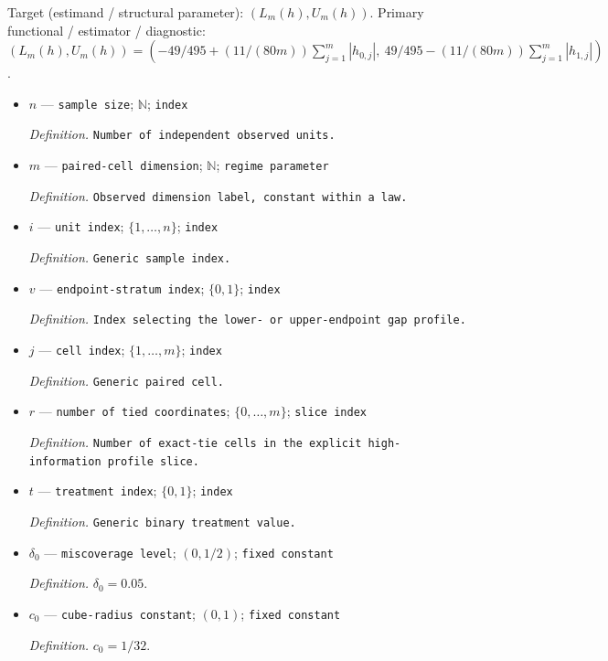 \documentclass{article}
\begin{document}
Target (estimand / structural parameter): \((L_m(h),U_m(h))\).
Primary functional / estimator / diagnostic: \((L_m(h),U_m(h))=(-49/495+(11/(80m))\sum_{j=1}^{m}|h_{0,j}|,\ 49/495-(11/(80m))\sum_{j=1}^{m}|h_{1,j}|)\).
\begin{itemize}
  \item \(n\) --- \texttt{sample size}; \(\mathbb N\); \texttt{index}
  \par\smallskip\noindent\emph{Definition.} \texttt{Number of independent observed units.}
  \item \(m\) --- \texttt{paired-\allowbreak{}cell dimension}; \(\mathbb N\); \texttt{regime parameter}
  \par\smallskip\noindent\emph{Definition.} \texttt{Observed dimension label,\allowbreak{} constant within a law.}
  \item \(i\) --- \texttt{unit index}; \(\{1,\ldots,n\}\); \texttt{index}
  \par\smallskip\noindent\emph{Definition.} \texttt{Generic sample index.}
  \item \(v\) --- \texttt{endpoint-\allowbreak{}stratum index}; \(\{0,1\}\); \texttt{index}
  \par\smallskip\noindent\emph{Definition.} \texttt{Index selecting the lower-\allowbreak{} or upper-\allowbreak{}endpoint gap profile.}
  \item \(j\) --- \texttt{cell index}; \(\{1,\ldots,m\}\); \texttt{index}
  \par\smallskip\noindent\emph{Definition.} \texttt{Generic paired cell.}
  \item \(r\) --- \texttt{number of tied coordinates}; \(\{0,\ldots,m\}\); \texttt{slice index}
  \par\smallskip\noindent\emph{Definition.} \texttt{Number of exact-\allowbreak{}tie cells in the explicit high-\allowbreak{}information profile slice.}
  \item \(t\) --- \texttt{treatment index}; \(\{0,1\}\); \texttt{index}
  \par\smallskip\noindent\emph{Definition.} \texttt{Generic binary treatment value.}
  \item \(\delta_0\) --- \texttt{miscoverage level}; \((0,1/2)\); \texttt{fixed constant}
  \par\smallskip\noindent\emph{Definition.} \(\delta_0=0.05\).
  \item \(c_0\) --- \texttt{cube-\allowbreak{}radius constant}; \((0,1)\); \texttt{fixed constant}
  \par\smallskip\noindent\emph{Definition.} \(c_0=1/32\).

\end{itemize}
\end{document}
